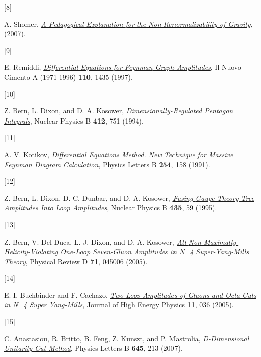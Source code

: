 \documentclass[
  10pt,
  a4paper,
  DIV=11,
  numbers=noendperiod,
  twoside]{scrreprt}
\newlength{\cslhangindent}
\newlength{\csllabelwidth}
\newlength{\cslentryspacingunit} %
\newenvironment{CSLReferences}[2] %
 {%
  \setlength{\parindent}{0pt}
  \ifodd #1
  \let\oldpar\par
  \def\par{\hangindent=\cslhangindent\oldpar}
  \fi
  \setlength{\parskip}{#2\cslentryspacingunit}
 }%
 {}
\newcommand{\CSLLeftMargin}[1]{\parbox[t]{\csllabelwidth}{#1}}
\newcommand{\CSLRightInline}[1]{\parbox[t]{\linewidth - \csllabelwidth}{#1}\break}
\DeclareRobustCommand{\[}{\begin{equation}}
\DeclareRobustCommand{\]}{\end{equation}}
\begin{document}
\begin{CSLReferences}{0}{0}
\leavevmode{}%
\CSLLeftMargin{{[}8{]} }%
\CSLRightInline{A. Shomer,
\emph{\href{https://arxiv.org/abs/0709.3555}{A Pedagogical Explanation
for the Non-Renormalizability of Gravity}}, (2007).}

\leavevmode{}%
\CSLLeftMargin{{[}9{]} }%
\CSLRightInline{E. Remiddi,
\emph{\href{https://doi.org/10.1007/BF03185566}{Differential Equations
for {Feynman} Graph Amplitudes}}, Il Nuovo Cimento A (1971-1996)
\textbf{110}, 1435 (1997).}

\leavevmode{}%
\CSLLeftMargin{{[}10{]} }%
\CSLRightInline{Z. Bern, L. Dixon, and D. A. Kosower,
\emph{\href{https://doi.org/10.1016/0550-3213(94)90398-0}{Dimensionally-Regulated
Pentagon Integrals}}, Nuclear Physics B \textbf{412}, 751 (1994).}

\leavevmode{}%
\CSLLeftMargin{{[}11{]} }%
\CSLRightInline{A. V. Kotikov,
\emph{\href{https://doi.org/10.1016/0370-2693(91)90413-K}{Differential
Equations Method. {New} Technique for Massive {Feynman} Diagram
Calculation}}, Physics Letters B \textbf{254}, 158 (1991).}

\leavevmode{}%
\CSLLeftMargin{{[}12{]} }%
\CSLRightInline{Z. Bern, L. Dixon, D. C. Dunbar, and D. A. Kosower,
\emph{\href{https://doi.org/10.1016/0550-3213(94)00488-Z}{Fusing {Gauge
Theory Tree Amplitudes Into Loop Amplitudes}}}, Nuclear Physics B
\textbf{435}, 59 (1995).}

\leavevmode{}%
\CSLLeftMargin{{[}13{]} }%
\CSLRightInline{Z. Bern, V. Del Duca, L. J. Dixon, and D. A. Kosower,
\emph{\href{https://doi.org/10.1103/PhysRevD.71.045006}{All
{Non-Maximally-Helicity-Violating One-Loop Seven-Gluon Amplitudes} in
{N}=4 {Super-Yang-Mills Theory}}}, Physical Review D \textbf{71}, 045006
(2005).}

\leavevmode{}%
\CSLLeftMargin{{[}14{]} }%
\CSLRightInline{E. I. Buchbinder and F. Cachazo,
\emph{\href{https://doi.org/10.1088/1126-6708/2005/11/036}{Two-{Loop
Amplitudes} of {Gluons} and {Octa-Cuts} in {N}=4 {Super Yang-Mills}}},
Journal of High Energy Physics \textbf{11}, 036 (2005).}

\leavevmode{}%
\CSLLeftMargin{{[}15{]} }%
\CSLRightInline{C. Anastasiou, R. Britto, B. Feng, Z. Kunszt, and P.
Mastrolia,
\emph{\href{https://doi.org/10.1016/j.physletb.2006.12.022}{D-Dimensional
Unitarity Cut Method}}, Physics Letters B \textbf{645}, 213 (2007).}


\end{CSLReferences}
\end{document}
